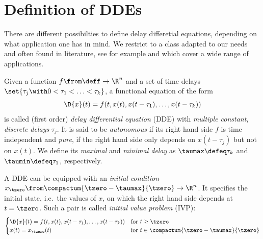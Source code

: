 \section{Definition of DDEs}
    \label{sec:definition-dde}

    There are different possibilties to define delay differetial equations, depending on what application one has in mind.
    We restrict to a class adapted to our needs and often found in literature, see for example \cite{Roussel04DDEs} and which cover a wide range of applications.

    \begin{definition}\label{def:dde}
        Given a function $f\from\deff\to\R^n$ and a set of time delays $\set{\tau_j\with 0<\tau_1<\ldots<\tau_k}$, a functional equation of the form
        \begin{equation}\label{eq:dde}
            \D{x}(t) = f(t,x(t),x(t-\tau_1),\ldots,x(t-\tau_k))
        \end{equation}
        is called (first order) \emph{delay differential equation} (DDE) with \emph{multiple constant, discrete delays} $\tau_j$.
        It is said to be \emph{autonomous} if its right hand side $f$ is time independent and \emph{pure}, if the right hand side only depends on $x(t-\tau_j)$ but not on $x(t)$.
        We define its \emph{maximal} and \emph{minimal delay} as $\taumax\defeq\tau_k$ and $\taumin\defeq\tau_1$, respectively.

        A DDE can be equipped with an \emph{initial condition} $x_{\tzero}\from \compactum{\tzero-\taumax}{\tzero} \to\R^n$. It specifies the initial state, i.e.\ the values of $x$, on which the right hand side depends at $t=\tzero$.
        Such a pair is called \emph{initial value problem} (IVP):
        \begin{equation}\label{eq:ivp}
            \begin{cases}
                \D{x}(t) = f(t,x(t),x(t-\tau_1),\ldots,x(t-\tau_k)) & \text{for } t\geq\tzero\\
                x(t) = x_{\tzero}(t) & \text{for } t\in\compactum{\tzero-\taumax}{\tzero}
            \end{cases}
        \end{equation}
    \end{definition}

